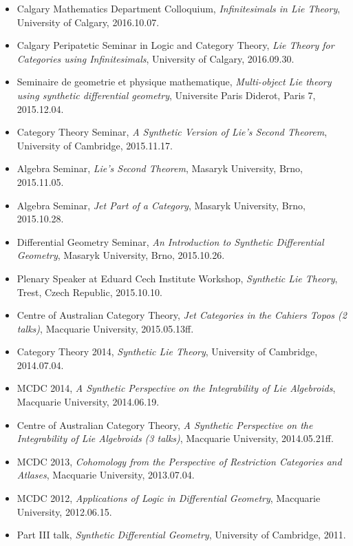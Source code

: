 \documentclass[10pt]{article}
\begin{document}
\begin{itemize}
    \item Calgary Mathematics Department Colloquium, \emph{Infinitesimals in Lie Theory}, University of Calgary, 2016.10.07.
    \item Calgary Peripatetic Seminar in Logic and Category Theory, \emph{Lie Theory for Categories using Infinitesimals}, University of Calgary, 2016.09.30.
    \item Seminaire de geometrie et physique mathematique, \emph{Multi-object Lie theory using synthetic differential geometry}, Universite Paris Diderot, Paris 7, 2015.12.04.
    \item Category Theory Seminar, \emph{A Synthetic Version of Lie's Second Theorem}, University of Cambridge, 2015.11.17.
    \item Algebra Seminar, \emph{Lie's Second Theorem}, Masaryk University, Brno, 2015.11.05.
    \item Algebra Seminar, \emph{Jet Part of a Category}, Masaryk University, Brno, 2015.10.28.
    \item Differential Geometry Seminar, \emph{An Introduction to Synthetic Differential Geometry}, Masaryk University, Brno, 2015.10.26.
    \item Plenary Speaker at Eduard Cech Institute Workshop, \emph{Synthetic Lie Theory}, Trest, Czech Republic, 2015.10.10.
    \item Centre of Australian Category Theory, \emph{Jet Categories in the Cahiers Topos (2 talks)}, Macquarie University, 2015.05.13ff.
    \item Category Theory 2014, \emph{Synthetic Lie Theory}, University of Cambridge, 2014.07.04.
    \item MCDC 2014, \emph{A Synthetic Perspective on the Integrability of Lie Algebroids}, Macquarie University, 2014.06.19.
    \item Centre of Australian Category Theory, \emph{A Synthetic Perspective on the Integrability of Lie Algebroids (3 talks)}, Macquarie University, 2014.05.21ff.
    \item MCDC 2013, \emph{Cohomology from the Perspective of Restriction Categories and Atlases}, Macquarie University, 2013.07.04.
    \item MCDC 2012, \emph{Applications of Logic in Differential Geometry}, Macquarie University, 2012.06.15.
    \item Part III talk, \emph{Synthetic Differential Geometry}, University of Cambridge, 2011.
\end{itemize}
\end{document}
